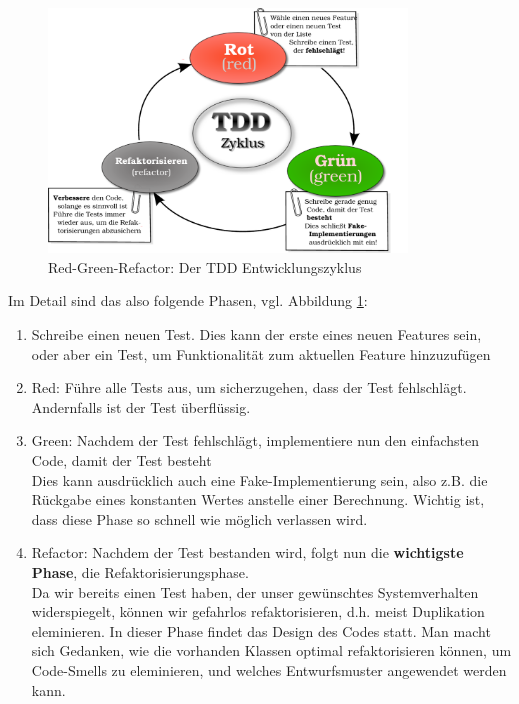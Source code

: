   \begin{figure}[htbp]
 \centering
 \includegraphics[width=0.85\textwidth]{./diagrams/red-green-refactor.pdf}
 \caption{Red-Green-Refactor: Der TDD Entwicklungszyklus}
 
 \label{fig:redgreenrefactor}
\end{figure}
  Im Detail sind das also folgende Phasen, vgl. Abbildung \ref{fig:redgreenrefactor}:
  \begin{enumerate}
   \item Schreibe einen neuen Test. Dies kann der erste eines neuen Features sein, oder aber ein Test, um Funktionalität zum aktuellen Feature hinzuzufügen
   \item Red: Führe alle Tests aus, um sicherzugehen, dass der Test fehlschlägt. Andernfalls ist der Test überflüssig.
   \item Green: Nachdem der Test fehlschlägt, implementiere nun den einfachsten Code, damit der Test besteht\\
   Dies kann ausdrücklich auch eine Fake-Implementierung sein, also z.B. die Rückgabe eines konstanten Wertes anstelle einer Berechnung. Wichtig ist, dass diese Phase so schnell wie möglich verlassen wird.
   \item Refactor: Nachdem der Test bestanden wird, folgt nun die \textbf{wichtigste Phase}, die Refaktorisierungsphase.\\
   Da wir bereits einen Test haben, der unser gewünschtes Systemverhalten widerspiegelt, können wir gefahrlos refaktorisieren, d.h. meist Duplikation eleminieren. In dieser Phase findet das Design des Codes statt. Man macht sich Gedanken, wie die vorhanden Klassen optimal refaktorisieren können, um Code-Smells zu eleminieren, und welches Entwurfsmuster angewendet werden kann.
  \end{enumerate}
  
